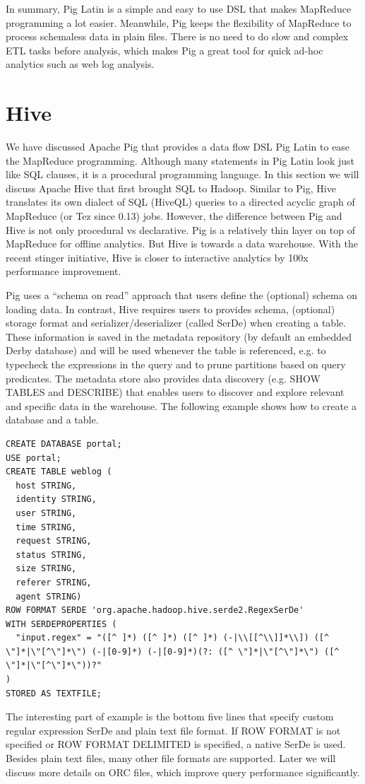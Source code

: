 \documentclass[11pt]{book}
\begin{document}
In summary, Pig Latin is a simple and easy to use DSL that makes MapReduce programming a lot easier. Meanwhile, Pig keeps the flexibility of MapReduce to process schemaless data in plain files. There is no need to do slow and complex ETL tasks before analysis, which makes Pig a great tool for quick ad-hoc analytics such as web log analysis.

\section{Hive}
We have discussed Apache Pig that provides a data flow DSL Pig Latin to ease the MapReduce programming. Although many statements in Pig Latin look just like SQL clauses, it is a procedural programming language. In this section we will discuss Apache Hive that first brought SQL to Hadoop. Similar to Pig, Hive translates its own dialect of SQL (HiveQL) queries to a directed acyclic graph of MapReduce (or Tez since 0.13) jobs. However, the difference between Pig and Hive is not only procedural vs declarative. Pig is a relatively thin layer on top of MapReduce for offline analytics. But Hive is towards a data warehouse. With the recent stinger initiative, Hive is closer to interactive analytics by 100x performance improvement.

Pig uses a ``schema on read'' approach that users define the (optional) schema on loading data. In contrast, Hive requires users to provides schema, (optional) storage format and serializer/deserializer (called SerDe) when creating a table. These information is saved in the metadata repository (by default an embedded Derby database) and will be used whenever the table is referenced, e.g. to typecheck the expressions in the query and to prune partitions based on query predicates. The metadata store also provides data discovery (e.g. SHOW TABLES and DESCRIBE) that enables users to discover and explore relevant and specific data in the warehouse. The following example shows how to create a database and a table.

\begin{lstlisting}
CREATE DATABASE portal;
USE portal;
CREATE TABLE weblog (
  host STRING,
  identity STRING,
  user STRING,
  time STRING,
  request STRING,
  status STRING,
  size STRING,
  referer STRING,
  agent STRING)
ROW FORMAT SERDE 'org.apache.hadoop.hive.serde2.RegexSerDe'
WITH SERDEPROPERTIES (
  "input.regex" = "([^ ]*) ([^ ]*) ([^ ]*) (-|\\[[^\\]]*\\]) ([^ \"]*|\"[^\"]*\") (-|[0-9]*) (-|[0-9]*)(?: ([^ \"]*|\"[^\"]*\") ([^ \"]*|\"[^\"]*\"))?"
)
STORED AS TEXTFILE;
\end{lstlisting}
The interesting part of example is the bottom five lines that specify custom regular expression SerDe and plain text file format. If ROW FORMAT is not specified or ROW FORMAT DELIMITED is specified, a native SerDe is used. Besides plain text files, many other file formats are supported. Later we will discuss more details on ORC files, which improve query performance significantly.
\end{document}
